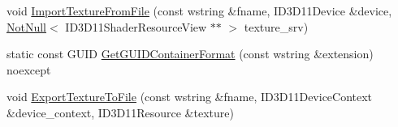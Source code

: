 \begin{DoxyCompactItemize}
\item 
void \hyperlink{namespacemage_1_1rendering_1_1loader_acdaa2ecd346a1e6e432628753c5b0240}{Import\+Texture\+From\+File} (const wstring \&fname, I\+D3\+D11\+Device \&device, \hyperlink{namespacemage_a8769f9d670d6b585ea306cb1062af94b}{Not\+Null}$<$ I\+D3\+D11\+Shader\+Resource\+View $\ast$$\ast$ $>$ texture\+\_\+srv)
\item 
static const G\+U\+ID \hyperlink{namespacemage_1_1rendering_1_1loader_a2e161011f6a18d7dbf4f4cc8688e2805}{Get\+G\+U\+I\+D\+Container\+Format} (const wstring \&extension) noexcept
\item 
void \hyperlink{namespacemage_1_1rendering_1_1loader_a4e167c800ff35ec8f7577118cb81ea74}{Export\+Texture\+To\+File} (const wstring \&fname, I\+D3\+D11\+Device\+Context \&device\+\_\+context, I\+D3\+D11\+Resource \&texture)
\end{DoxyCompactItemize}
